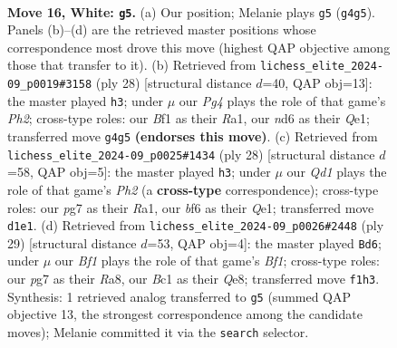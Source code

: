 \documentclass[11pt]{article}
\begin{document}
\clearpage

\begin{figure}[p]\centering
\begin{subfigure}{0.46\textwidth}\centering
\resizebox{\linewidth}{!}{%
\newchessgame
\chessboard[
  setfen={1rb2qk1/p1pp1ppp/3n1b2/8/1p1P2P1/NP6/P1P2P1P/1RBQ1BK1 w - - 0 16},
  showmover=false,
  pgfstyle=straightmove, color=movearrow, markmove={g4-g5}
]}
\caption{}
\end{subfigure}\hfill
\begin{subfigure}{0.46\textwidth}\centering
\resizebox{\linewidth}{!}{%
\newchessgame
\chessboard[
  setfen={r1bq2k1/ppp2ppp/3n1b2/3p4/3P1B2/2P5/PP1N1PPP/R3QBK1 w - - 2 15},
  showmover=false,
  pgfstyle=straightmove, color=movearrow, markmove={h2-h3}
]}
\caption{}
\end{subfigure}
\\[4pt]
\begin{subfigure}{0.46\textwidth}\centering
\resizebox{\linewidth}{!}{%
\newchessgame
\chessboard[
  setfen={r2qn1k1/ppp2ppp/5b2/3p1b2/3P1B2/2P5/PP1N1PPP/R3QBK1 w - - 2 15},
  showmover=false,
  pgfstyle=straightmove, color=movearrow, markmove={h2-h3}
]}
\caption{}
\end{subfigure}\hfill
\begin{subfigure}{0.46\textwidth}\centering
\resizebox{\linewidth}{!}{%
\newchessgame
\chessboard[
  setfen={r3qbk1/pp1n1ppp/2p5/P2p1b2/3P4/5B2/1PP2PPP/R1BQN1K1 b - - 0 15},
  showmover=false,
  pgfstyle=straightmove, color=movearrow, markmove={f8-d6}
]}
\caption{}
\end{subfigure}
\caption{\textbf{Move 16, White: \texttt{g5}.} (a) Our position; Melanie plays \texttt{g5} (\texttt{g4g5}). Panels (b)--(d) are the retrieved master positions whose correspondence most drove this move (highest QAP objective among those that transfer to it). (b) Retrieved from \texttt{lichess\_elite\_2024-09\_p0019\#3158} (ply 28) [structural distance $d$=40, QAP obj=13]: the master played \texttt{h3}; under $\mu$ our \emph{Pg4} plays the role of that game's \emph{Ph2}; cross-type roles: our \emph{B}f1 as their \emph{R}a1, our \emph{n}d6 as their \emph{Q}e1; transferred move \texttt{g4g5} \textbf{(endorses this move)}. (c) Retrieved from \texttt{lichess\_elite\_2024-09\_p0025\#1434} (ply 28) [structural distance $d$=58, QAP obj=5]: the master played \texttt{h3}; under $\mu$ our \emph{Qd1} plays the role of that game's \emph{Ph2} (a \textbf{cross-type} correspondence); cross-type roles: our \emph{p}g7 as their \emph{R}a1, our \emph{b}f6 as their \emph{Q}e1; transferred move \texttt{d1e1}. (d) Retrieved from \texttt{lichess\_elite\_2024-09\_p0026\#2448} (ply 29) [structural distance $d$=53, QAP obj=4]: the master played \texttt{Bd6}; under $\mu$ our \emph{Bf1} plays the role of that game's \emph{Bf1}; cross-type roles: our \emph{p}g7 as their \emph{R}a8, our \emph{B}c1 as their \emph{Q}e8; transferred move \texttt{f1h3}. Synthesis: 1 retrieved analog transferred to \texttt{g5} (summed QAP objective 13, the strongest correspondence among the candidate moves); Melanie committed it via the \texttt{search} selector.}
\label{fig:thought-m30}
\end{figure}
\end{document}
